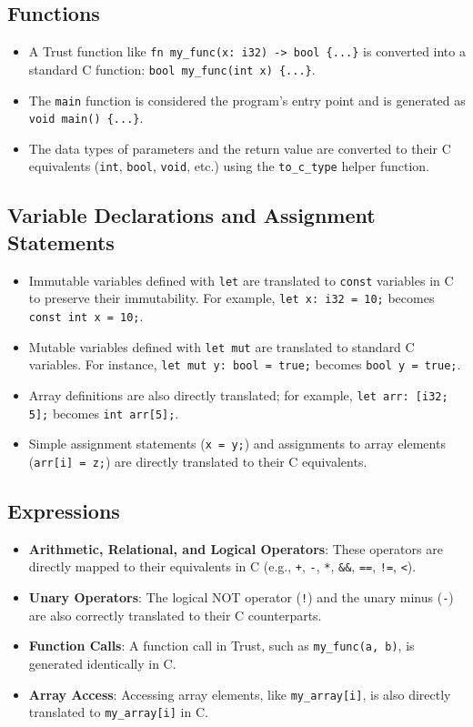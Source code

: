 \documentclass[12pt, a4paper]{report}
\begin{document}
\subsection{Functions}
\begin{itemize}
    \item A Trust function like \texttt{fn my\_func(x: i32) -> bool \{...\}} is converted into a standard C function: \texttt{bool my\_func(int x) \{...\}}.
    \item The \texttt{main} function is considered the program's entry point and is generated as \texttt{void main() \{...\}}.
    \item The data types of parameters and the return value are converted to their C equivalents (\texttt{int}, \texttt{bool}, \texttt{void}, etc.) using the \texttt{to\_c\_type} helper function.
\end{itemize}

\subsection{Variable Declarations and Assignment Statements}
\begin{itemize}
    \item Immutable variables defined with \texttt{let} are translated to \texttt{const} variables in C to preserve their immutability. For example, \texttt{let x: i32 = 10;} becomes \texttt{const int x = 10;}.
    \item Mutable variables defined with \texttt{let mut} are translated to standard C variables. For instance, \texttt{let mut y: bool = true;} becomes \texttt{bool y = true;}.
    \item Array definitions are also directly translated; for example, \texttt{let arr: [i32; 5];} becomes \texttt{int arr[5];}.
    \item Simple assignment statements (\texttt{x = y;}) and assignments to array elements (\texttt{arr[i] = z;}) are directly translated to their C equivalents.
\end{itemize}

\subsection{Expressions}
\begin{itemize}
    \item \textbf{Arithmetic, Relational, and Logical Operators}: These operators are directly mapped to their equivalents in C (e.g., \texttt{+}, \texttt{-}, \texttt{*}, \texttt{&&}, \texttt{==}, \texttt{!=}, \texttt{<}).
    \item \textbf{Unary Operators}: The logical NOT operator (\texttt{!}) and the unary minus (\texttt{-}) are also correctly translated to their C counterparts.
    \item \textbf{Function Calls}: A function call in Trust, such as \texttt{my\_func(a, b)}, is generated identically in C.
    \item \textbf{Array Access}: Accessing array elements, like \texttt{my\_array[i]}, is also directly translated to \texttt{my\_array[i]} in C.
\end{itemize}
\end{document}
